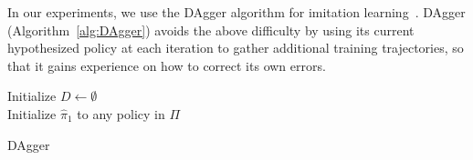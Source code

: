 \documentclass[twoside,11pt]{article}
\begin{document}
In our experiments, we use the DAgger algorithm for imitation learning~\citep{DAgger}. DAgger (Algorithm~\ref{alg:DAgger}) avoids the above difficulty by using its current hypothesized policy at each iteration to gather additional training trajectories, so that it gains experience on how to correct its own errors.
%
%


\begin{algorithm}[htb]
 Initialize $D \leftarrow \emptyset$ \\
 Initialize $\hat{\pi}_1$ to any policy in $\Pi$ \\
 \caption{DAgger}
 \label{alg:DAgger}
\end{algorithm}
\end{document}
